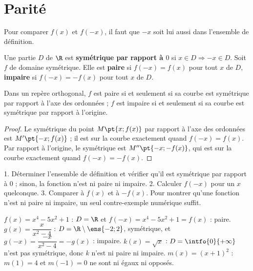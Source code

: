 \section{Parité}
Pour comparer $f(x)$ et $f(-x)$, il faut que $-x$ soit lui aussi dans l'ensemble de définition.
\begin{definition}
Une partie $D$ de $\R$ est \textbf{symétrique par rapport à $0$} si $x\in D\Rightarrow-x\in D$. Soit $f$ de domaine symétrique. Elle est \textbf{paire} si $f(-x)=f(x)$ pour tout $x$ de $D$, \textbf{impaire} si $f(-x)=-f(x)$ pour tout $x$ de $D$.
\end{definition}
\begin{theorem}
Dans un repère orthogonal, $f$ est paire si et seulement si sa courbe est symétrique par rapport à l'axe des ordonnées ; $f$ est impaire si et seulement si sa courbe est symétrique par rapport à l'origine.
\end{theorem}
\begin{proof}
Le symétrique du point $M\pt{x;f(x)}$ par rapport à l'axe des ordonnées est $M'\pt{-x;f(x)}$ ; il est sur la courbe exactement quand $f(-x)=f(x)$. Par rapport à l'origine, le symétrique est $M''\pt{-x;-f(x)}$, qui est sur la courbe exactement quand $f(-x)=-f(x)$.
\end{proof}
\begin{figurebox}
\end{figurebox}
\begin{method}
1. Déterminer l'ensemble de définition et vérifier qu'il est symétrique par rapport à $0$ ; sinon, la fonction n'est ni paire ni impaire. 2. Calculer $f(-x)$ pour un $x$ quelconque. 3. Comparer à $f(x)$ et à $-f(x)$. Pour montrer qu'une fonction n'est ni paire ni impaire, un seul contre-exemple numérique suffit.
\end{method}
\begin{example}
$f(x)=x^4-5x^2+1$ : $D=\R$ et $f(-x)=x^4-5x^2+1=f(x)$ : paire. $g(x)=\dfrac{x}{x^2-4}$ : $D=\R\setminus\ens{-2;2}$, symétrique, et $g(-x)=\dfrac{-x}{x^2-4}=-g(x)$ : impaire. $k(x)=\sqrt{x}$ : $D=\intfo{0}{+\infty}$ n'est pas symétrique, donc $k$ n'est ni paire ni impaire. $m(x)=(x+1)^2$ : $m(1)=4$ et $m(-1)=0$ ne sont ni égaux ni opposés.
\end{example}
